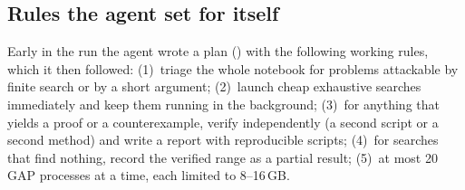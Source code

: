 \subsection{Rules the agent set for itself}
Early in the run the agent wrote a plan () with the following working rules, which it then
followed: (1)~triage the whole notebook for problems attackable by finite search or by a short argument;
(2)~launch cheap exhaustive searches immediately and keep them running in the background; (3)~for anything that
yields a proof or a counterexample, verify independently (a second script or a second method) and write a report
with reproducible scripts; (4)~for searches that find nothing, record the verified range as a partial result;
(5)~at most 20 GAP processes at a time, each limited to 8--16\,GB.
